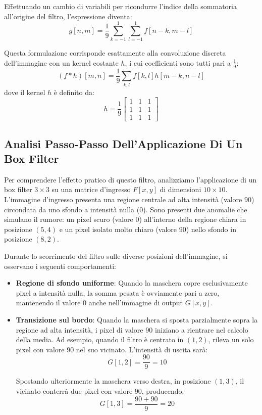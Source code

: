 ﻿\documentclass[11pt, a4paper]{article}
\begin{document}
Effettuando un cambio di variabili per ricondurre l'indice della sommatoria all'origine del filtro, l'espressione diventa:
\[ g[n, m] = \frac{1}{9} \sum_{k=-1}^{1} \sum_{l=-1}^{1} f[n-k, m-l] \]

Questa formulazione corrisponde esattamente alla convoluzione discreta dell'immagine con un kernel costante $h$, i cui coefficienti sono tutti pari a $\frac{1}{9}$:
\[ (f * h)[m, n] = \frac{1}{9} \sum_{k, l} f[k, l] h[m-k, n-l] \]
dove il kernel $h$ è definito da:
\[ h = \frac{1}{9} \begin{bmatrix} 1 & 1 & 1 \\ 1 & 1 & 1 \\ 1 & 1 & 1 \end{bmatrix} \]

\subsection{Analisi Passo-Passo Dell'Applicazione Di Un Box Filter}

Per comprendere l'effetto pratico di questo filtro, analizziamo l'applicazione di un box filter $3\times3$ su una matrice d'ingresso $F[x,y]$ di dimensioni $10\times10$. L'immagine d'ingresso presenta una regione centrale ad alta intensità (valore $90$) circondata da uno sfondo a intensità nulla ($0$). Sono presenti due anomalie che simulano il rumore: un pixel scuro (valore $0$) all'interno della regione chiara in posizione $(5,4)$ e un pixel isolato molto chiaro (valore $90$) nello sfondo in posizione $(8,2)$.


Durante lo scorrimento del filtro sulle diverse posizioni dell'immagine, si osservano i seguenti comportamenti:
\begin{itemize}
    \item \textbf{Regione di sfondo uniforme}: Quando la maschera copre esclusivamente pixel a intensità nulla, la somma pesata è ovviamente pari a zero, mantenendo il valore $0$ anche nell'immagine di output $G[x,y]$.
    \item \textbf{Transizione sul bordo}: Quando la maschera si sposta parzialmente sopra la regione ad alta intensità, i pixel di valore $90$ iniziano a rientrare nel calcolo della media. Ad esempio, quando il filtro è centrato in $(1,2)$, rileva un solo pixel con valore $90$ nel suo vicinato. L'intensità di uscita sarà:
    \[ G[1, 2] = \frac{90}{9} = 10 \]

    Spostando ulteriormente la maschera verso destra, in posizione $(1,3)$, il vicinato conterrà due pixel con valore $90$, producendo:
    \[ G[1, 3] = \frac{90 + 90}{9} = 20 \]
\end{itemize}
\end{document}

